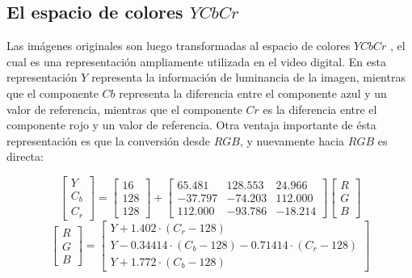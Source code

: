 \subsection{El espacio de colores $YCbCr$}

Las imágenes originales son luego transformadas al espacio de colores $YCbCr$ \cite{gonzalez2002processing}, el cual es una representación ampliamente utilizada en el video digital. En esta representación $Y$ representa la información de luminancia de la imagen, mientras que el componente $Cb$ representa la diferencia entre el componente azul y un valor de referencia, mientras que el componente $Cr$ es la diferencia entre el componente rojo y un valor de referencia. Otra ventaja importante de ésta representación es que la conversión desde $RGB$, y nuevamente hacia $RGB$ es directa:

\begin{equation}
\begin{bmatrix}
Y \\
C_b \\
C_r 
\end{bmatrix} =
\begin{bmatrix}
16  \\
128 \\
128
\end{bmatrix}
+
\begin{bmatrix}
65.481 & 128.553 & 24.966 \\
-37.797 & -74.203 & 112.000 \\
112.000 & -93.786 & -18.214 
\end{bmatrix}
\begin{bmatrix}
R \\
G \\
B 
\end{bmatrix}
\end{equation}
\begin{equation}
\begin{bmatrix}
R \\
G \\
B 
\end{bmatrix} =
\begin{bmatrix}
Y + 1.402 \cdot (C_r - 128) \\
Y -0.34414 \cdot (C_b - 128) - 0.71414 \cdot (C_r - 128) \\
Y + 1.772 \cdot  (C_b - 128) 
\end{bmatrix}
\end{equation}

